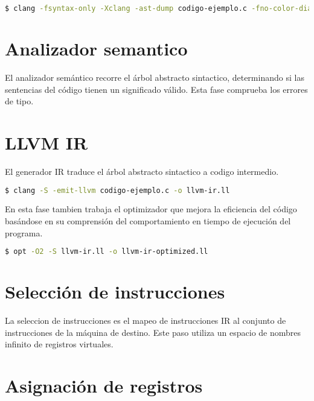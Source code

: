 \begin{lstlisting}[label=comandoC, caption= Comando de compilación del archivo codigo-ejemplo.c \cite{repositorio} para CLANG/LLVM., language=bash]
    $ clang -fsyntax-only -Xclang -ast-dump codigo-ejemplo.c -fno-color-diagnostics > ast \end{lstlisting}

\section{Analizador semantico}
El analizador semántico recorre el árbol abstracto sintactico, 
determinando si las sentencias del código tienen un significado válido. 
Esta fase comprueba los errores de tipo.

\section{LLVM IR}
El generador IR traduce el árbol abstracto sintactico a codigo intermedio. 

\begin{lstlisting}[label=comandoC, caption= Comando de compilación del archivo codigo-ejemplo.c \cite{repositorio} para CLANG/LLVM., language=bash]
    $ clang -S -emit-llvm codigo-ejemplo.c -o llvm-ir.ll \end{lstlisting}

En esta fase tambien trabaja el optimizador que mejora la eficiencia del código basándose 
en su comprensión del comportamiento en tiempo de ejecución del programa. 

\begin{lstlisting}[label=comandoC, caption= Comando de compilación del archivo codigo-ejemplo.c \cite{repositorio} para CLANG/LLVM., language=bash]
    $ opt -O2 -S llvm-ir.ll -o llvm-ir-optimized.ll \end{lstlisting}

\section{Selección de instrucciones} 

La seleccion de instrucciones es el mapeo de instrucciones IR al conjunto 
de instrucciones de la máquina de destino. Este paso utiliza un espacio de 
nombres infinito de registros virtuales.

\section{Asignación de registros} 

